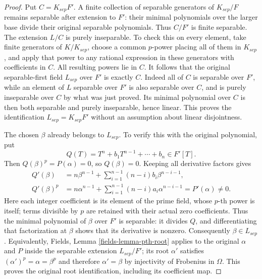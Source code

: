 \begin{proof}
Put $C=K_{sep}F'$. A finite collection of separable
generators of $K_{sep}/F$ remains separable after
extension to $F'$: their minimal polynomials over
the larger base divide their original separable
polynomials. Thus $C/F'$ is finite separable.
The extension $L/C$ is purely inseparable. To
check this on every element, take finite
generators of $K/K_{sep}$, choose a common
$p$-power placing all of them in $K_{sep}$,
and apply that power to any rational expression
in these generators with coefficients in $C$.
All resulting powers lie in $C$.
It follows that the original separable-first
field $L_{sep}$ over $F'$ is exactly $C$.
Indeed all of $C$ is separable over $F'$, while
an element of $L$ separable over $F'$ is also
separable over $C$, and is purely inseparable
over $C$ by what was just proved. Its minimal
polynomial over $C$ is then both separable and
purely inseparable, hence linear. This proves
the identification $L_{sep}=K_{sep}F'$ without
an assumption about linear disjointness.

The chosen $\beta$ already belongs to $L_{sep}$.
To verify this with the original polynomial, put
$$
Q(T)=T^n+b_1T^{n-1}+\cdots+b_n\in F'[T].
$$
Then $Q(\beta)^p=P(\alpha)=0$, so
$Q(\beta)=0$. Keeping all derivative factors gives
$$
\begin{split}
Q'(\beta)&=n\beta^{n-1}
+\sum_{i=1}^{n-1}(n-i)b_i\beta^{n-i-1},\\
Q'(\beta)^p&=n\alpha^{n-1}
+\sum_{i=1}^{n-1}(n-i)a_i\alpha^{n-i-1}
=P'(\alpha)\ne0.
\end{split}
$$
Here each integer coefficient is its element of
the prime field, whose $p$-th power is itself;
terms divisible by $p$ are retained with their
actual zero coefficients. Thus the minimal
polynomial of $\beta$ over $F'$ is separable:
it divides $Q$, and differentiating that
factorization at $\beta$ shows that its
derivative is nonzero. Consequently
$\beta\in L_{sep}$. Equivalently, Fields,
Lemma \ref{fields-lemma-pth-root} applies to
the original $\alpha$ and $P$ inside the separable
extension $L_{sep}/F'$; its root $\alpha'$
satisfies $(\alpha')^p=\alpha=\beta^p$ and
therefore $\alpha'=\beta$ by injectivity of
Frobenius in $\Omega$. This proves the original
root identification, including its coefficient map.


\end{proof}

